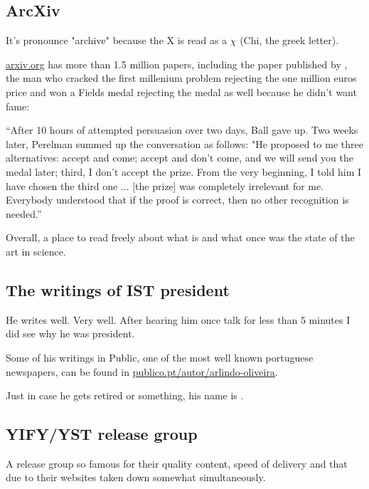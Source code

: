 \subsection{ArcXiv}
\par It's pronounce "archive" because the X is read as a $\chi$ (Chi, the greek letter).
\par \href{https://arxiv.org/}{\ul{arxiv.org}} has more than 1.5 million papers, including the paper published by , the man who cracked the first millenium problem rejecting the one million euros price and won a Fields medal rejecting the medal as well because he didn't want fame: 

\begin{center}
    ``After 10 hours of attempted persuasion over two days, Ball gave up. Two weeks later, Perelman summed up the conversation as follows: "He proposed to me three alternatives: accept and come; accept and don't come, and we will send you the medal later; third, I don't accept the prize. From the very beginning, I told him I have chosen the third one ... [the prize] was completely irrelevant for me. Everybody understood that if the proof is correct, then no other recognition is needed.''
\end{center}
\par Overall, a place to read freely about what is and what once was the state of the art in science.

\subsection{The writings of IST president}
\par He writes well. Very well. After hearing him once talk for less than 5 minutes I did see why he was president.
\par Some of his writings in Public, one of the most well known portuguese newspapers, can be found in \href{https://www.publico.pt/autor/arlindo-oliveira}{\ul{publico.pt/autor/arlindo-oliveira}}.
\par Just in case he gets retired or something, his name is .



\subsection{YIFY/YST release group}
A release group so famous for their quality content, speed of delivery and that due to their websites taken down somewhat simultaneously. 

